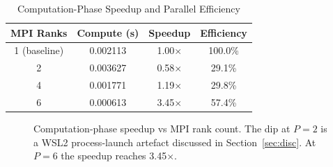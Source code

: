 \documentclass[12pt,a4paper]{article}
\begin{document}
\begin{table}[!htbp]
\centering
\small
\caption{Computation-Phase Speedup and Parallel Efficiency}
\label{tab:speedup}
\renewcommand{\arraystretch}{1.3}
\begin{tabular}{|c|c|c|c|}
\hline
\textbf{MPI Ranks} & \textbf{Compute (s)} &
\textbf{Speedup} & \textbf{Efficiency} \\
\hline
1 (baseline) & 0.002113 & 1.00$\times$ & 100.0\% \\
2            & 0.003627 & 0.58$\times$ &  29.1\% \\
4            & 0.001771 & 1.19$\times$ &  29.8\% \\
6            & 0.000613 & 3.45$\times$ &  57.4\% \\
\hline
\end{tabular}
\end{table}

\begin{figure}[!htbp]
\centering
{}
\caption{Computation-phase speedup vs MPI rank count. The dip at $P=2$
         is a WSL2 process-launch artefact discussed in
         Section~\ref{sec:disc}. At $P=6$ the speedup reaches
         3.45$\times$.}
\label{fig:speedup}
\end{figure}
\end{document}
